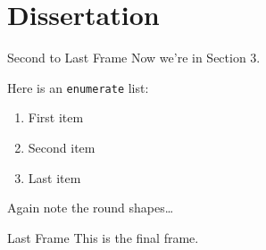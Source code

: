 \section{Dissertation}

\begin{frame}{Second to Last Frame}
    Now we're in Section 3.

    Here is an \texttt{enumerate} list:
    \begin{enumerate}
        \item
        First item

        \item
        Second item

        \item
        Last item
    \end{enumerate}
    Again note the round shapes\dots
\end{frame}

\begin{frame}{Last Frame}
    This is the final frame.
\end{frame}


\thanksframe
